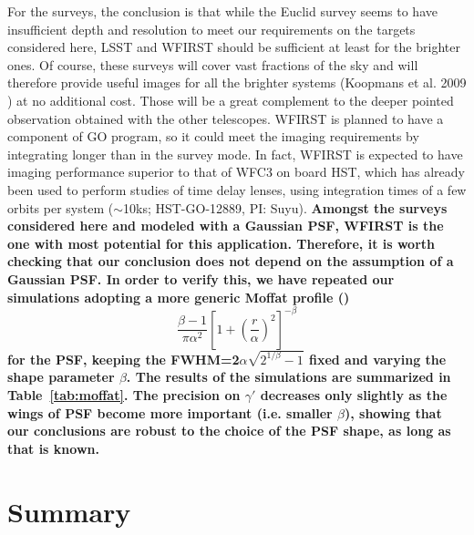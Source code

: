 \documentclass[a4paper,11pt]{article}
\begin{document}
For the surveys, the conclusion is that while the Euclid survey seems
to have insufficient depth and resolution to meet our requirements on
the targets considered here, LSST and WFIRST should be sufficient at
least for the brighter ones. Of course, these surveys will cover vast
fractions of the sky and will therefore provide useful images for all
the brighter systems (Koopmans et al. 2009 \cite{2009astro2010S.159K})
at no additional cost.  Those will be a great complement to the deeper
pointed observation obtained with the other telescopes. WFIRST is
planned to have a component of GO program, so it could meet the
imaging requirements by integrating longer than in the survey mode. In
fact, WFIRST is expected to have imaging performance superior to that
of WFC3 on board HST, which has already been used to perform studies
of time delay lenses, using integration times of a few orbits per
system ($\sim$10ks; HST-GO-12889, PI: Suyu). {\bf Amongst the surveys
considered here and modeled with a Gaussian PSF, WFIRST is the one
with most potential for this application. Therefore, it is worth
checking that our conclusion does not depend on the assumption of a
Gaussian PSF. In order to verify this, we have repeated our simulations
adopting a more generic Moffat profile (\cite{1969A&A.....3..455M})
%
\begin{equation}
\label{eq:moffat}
\frac{\beta-1}{\pi \alpha^2}\left[1+\left(\frac{r}{\alpha}\right)^2\right]^{-\beta}
\end{equation}
%
for the PSF, keeping the FWHM=2$\alpha\sqrt{2^{1/\beta}-1}$ fixed and
varying the shape parameter $\beta$. The results of the simulations
are summarized in Table~\ref{tab:moffat}. The precision on $\gamma'$
decreases only slightly as the wings of PSF become more important
(i.e. smaller $\beta$), showing that our conclusions are robust to the
choice of the PSF shape, as long as that is known.}

\section{Summary}
\end{document}
